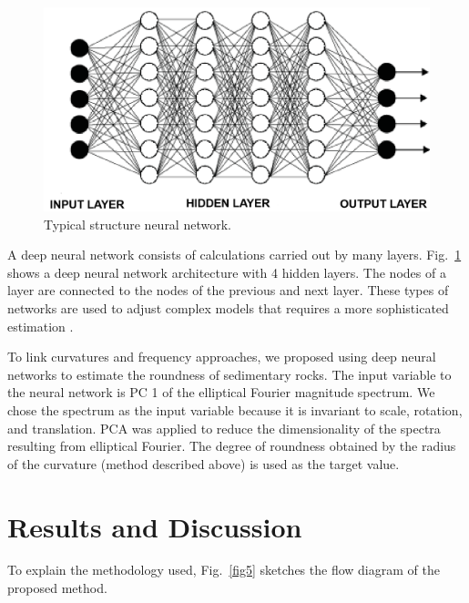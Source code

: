 \documentclass[conference]{IEEEtran}
\begin{document}
\begin{figure}[htbp]
	\centerline{\includegraphics[scale=0.6]{fig4.png}}
	\caption{Typical structure neural network.}
	\label{fig4}
\end{figure}

A deep neural network consists of calculations carried out by many layers. Fig.~\ref{fig4} shows a deep neural network architecture with 4 hidden layers. The nodes of a layer are connected to the nodes of the previous and next layer. These types of networks are used to adjust complex models that requires a more sophisticated estimation \cite{b12}.

To link curvatures and frequency approaches, we proposed using deep neural networks to estimate the roundness of sedimentary rocks. The input variable to the neural network is PC 1 of the elliptical Fourier magnitude spectrum. We chose the spectrum as the input variable because it is invariant to scale, rotation, and translation. PCA was applied to reduce the dimensionality of the spectra resulting from elliptical Fourier. The degree of roundness obtained by the radius of the curvature (method described above) is used as the target value.

\section{Results and Discussion}
To explain the methodology used, Fig.~\ref{fig5} sketches the flow diagram of the proposed method.
\end{document}
